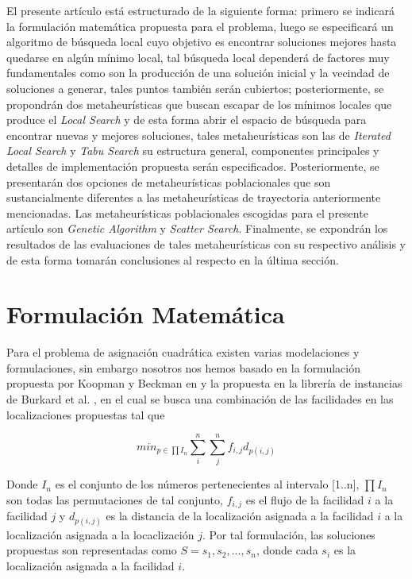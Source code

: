\documentclass{ci5652}
\begin{document}
El presente artículo está estructurado de la siguiente forma: primero se indicará la formulación matemática propuesta para el problema, luego se especificará un algoritmo de búsqueda local cuyo objetivo es encontrar soluciones mejores hasta quedarse en algún mínimo local, tal búsqueda local dependerá de factores muy fundamentales como son la producción de una solución inicial y la vecindad de soluciones a generar, tales puntos también serán cubiertos; posteriormente, se propondrán dos metaheurísticas que buscan escapar de los mínimos locales que produce el \textit{Local Search} y de esta forma abrir el espacio de búsqueda para encontrar nuevas y mejores soluciones, tales metaheurísticas son las de \textit{Iterated Local Search} y \textit{Tabu Search} su estructura general, componentes principales y detalles de implementación propuesta serán especificados. Posteriormente, se presentarán dos opciones de metaheurísticas poblacionales que son sustancialmente diferentes a las metaheurísticas de trayectoria anteriormente mencionadas. Las metaheurísticas poblacionales escogidas para el presente artículo son \textit{Genetic Algorithm} y \textit{Scatter Search}. Finalmente, se expondrán los resultados de las evaluaciones de tales metaheurísticas con su respectivo análisis y de esta forma tomarán conclusiones al respecto en la última sección. 

\section{Formulación Matemática}

Para el problema de asignación cuadrática existen varias modelaciones y formulaciones, sin embargo nosotros nos hemos basado en la formulación propuesta por Koopman y Beckman en \cite{koopmans1957} y la propuesta en la librería de instancias de Burkard et al. \cite{burkard2012}, en el cual se busca una combinación de las facilidades en las localizaciones propuestas tal que

\[min_{p\in \prod I_{n}} \sum_{i}^{n}\sum_{j}^{n}f_{i,j}d_{p(i,j)}\]

Donde \(I_{n}\) es el conjunto de los números pertenecientes al intervalo [1..n], \(\prod I_{n}\) son todas las permutaciones de tal conjunto, \(f_{i,j}\) es el flujo de la facilidad \(i\) a la facilidad \(j\) y \(d_{p(i,j)}\) es la distancia de la localización asignada a la facilidad \(i\) a la localización asignada a la locaclización \(j\). Por tal formulación, las soluciones propuestas son representadas como \(S = {s_{1}}, s_{2}, ..., s_{n}\), donde cada \(s_{i}\) es la localización asignada a la facilidad \(i\).
\end{document}
